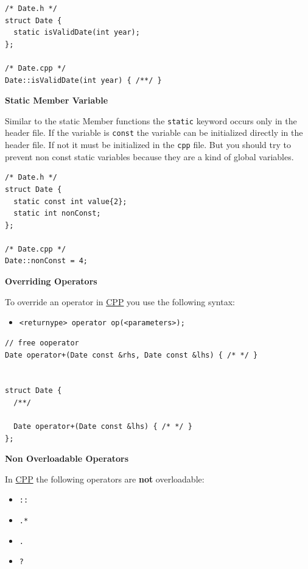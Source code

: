 \documentclass[11pt,twoside,landscape]{article}
\begin{document}
\begin{multicols}{3}
\lstset{language=c++,label= ,caption= ,captionpos=b,numbers=none}
\begin{lstlisting}
/* Date.h */
struct Date {
  static isValidDate(int year);
};

/* Date.cpp */
Date::isValidDate(int year) { /**/ }
\end{lstlisting}

\textbf{Static Member Variable}

Similar to the static Member functions the \texttt{static} keyword occurs only in the header file.
If the variable is \texttt{const} the variable can be initialized directly in the header file.
If not it must be initialized in the \texttt{cpp} file.
But you should try to prevent non const static variables because they are a kind of global variables.

\lstset{language=c++,label= ,caption= ,captionpos=b,numbers=none}
\begin{lstlisting}
/* Date.h */
struct Date {
  static const int value{2};
  static int nonConst;
};

/* Date.cpp */
Date::nonConst = 4;
\end{lstlisting}

\textbf{Overriding Operators}

To override an operator in \href{../../../roam/20210920103243-c.org}{CPP} you use the following syntax:
\begin{itemize}
\item \texttt{<returnype> operator op(<parameters>);}
\end{itemize}
\lstset{language=c++,label= ,caption= ,captionpos=b,numbers=none}
\begin{lstlisting}
// free ooperator
Date operator+(Date const &rhs, Date const &lhs) { /* */ }


struct Date {
  /**/

  Date operator+(Date const &lhs) { /* */ }
};
\end{lstlisting}

\textbf{Non Overloadable Operators}

In \href{../../../roam/20210920103243-c.org}{CPP} the following operators are \textbf{not} overloadable:
\begin{itemize}
\item \texttt{::}
\item \texttt{.*}
\item \texttt{.}
\item \texttt{?}
\end{itemize}


\end{multicols}
\end{document}

